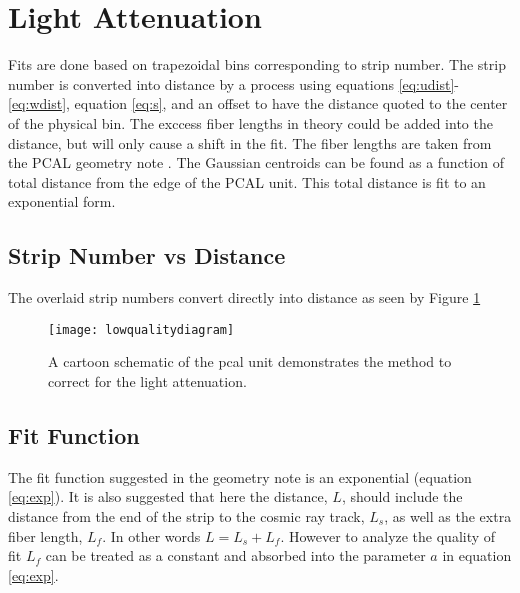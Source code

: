 \section{Light Attenuation}
Fits are done based on trapezoidal bins corresponding to strip number. 
The strip number is converted into distance by a process using equations \ref{eq:udist}-\ref{eq:wdist}, 
equation \ref{eq:s}, and an offset to have the distance quoted to the center of the physical bin. 
The exccess fiber lengths in theory could be added into the distance, but will only cause a shift in the fit.
The fiber lengths are taken from the PCAL geometry note \cite{bib:geomnote}. 
The Gaussian centroids can be found as a function of total distance from the edge of the PCAL unit.
This total distance is fit to an exponential form. 




\subsection{Strip Number vs Distance}
\FloatBarrier

The overlaid strip numbers convert directly into distance as seen by Figure \ref{fig:lowqualdist}

\begin{figure}[h]
\centering
\texttt{[image: lowqualitydiagram]}
\caption{A cartoon schematic of the pcal unit demonstrates the method to correct for the light attenuation.}
\label{fig:lowqualdist}
\end{figure}





\FloatBarrier
\subsection{Fit Function}
\FloatBarrier
The fit function suggested in the geometry note is an  exponential (equation \ref{eq:exp}).
It is also suggested that here the distance, $L$, should include the distance from the end of the strip 
to the cosmic ray track, $L_{s}$, as well as the extra fiber length, $L_{f}$.
In other words $L = L_{s} + L_{f}$.
However to analyze the quality of fit $L_{f}$ can be treated as a constant and absorbed into the parameter 
$a$ in equation \ref{eq:exp}.

